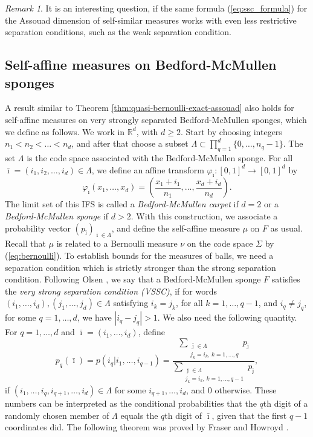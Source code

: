 \documentclass{PRM}
\newcommand{\field}[1]{\mathbb{#1}}
\newcommand{\R}{\field{R}}
\theoremstyle{plain}
\theoremstyle{definition}
\theoremstyle{remark}
\newtheorem{huom}[thm]{Remark}
\begin{document}
\begin{huom}
It is an interesting question, if the same formula (\ref{eq:ssc_formula}) for the Assouad dimension of self-similar measures works with even less restrictive separation conditions, such as the weak separation condition.
\end{huom}

\subsection{Self-affine measures on Bedford-McMullen sponges}

A result similar to Theorem \ref{thm:quasi-bernoulli-exact-assouad} also holds for self-affine measures on very strongly separated Bedford-McMullen sponges, which we define as follows. We work in $\R^d$, with $d\geq 2$. Start by choosing integers $n_1<n_2<\ldots<n_d$, and after that choose a subset $\Lambda\subset \prod_{q=1}^d\{0,\ldots,n_q - 1\}$. The set $\Lambda$ is the code space associated with the Bedford-McMullen sponge. For all $\bar{\imath}=(i_1,i_2,\ldots,i_d)\in\Lambda$, we define an affine transform $\varphi_{\bar{\imath}}:[0,1]^d\to[0,1]^d$ by
\begin{equation*}
    \varphi_{\bar{\imath}}(x_1,\ldots,x_d)=\left(\frac{x_1+i_1}{n_1},\ldots,\frac{x_d+i_d}{n_d}\right).
\end{equation*}
The limit set of this IFS is called a \emph{Bedford-McMullen carpet} if $d=2$ or a \emph{Bedford-McMullen sponge} if $d>2$. With this construction, we associate a probability vector $(p_{\bar{\imath}})_{\bar{\imath}\in\Lambda}$, and define the self-affine measure $\mu$ on $F$ as usual. Recall that $\mu$ is related to a Bernoulli measure $\nu$ on the code space $\Sigma$ by (\ref{eq:bernoulli}). To establish bounds for the measures of balls, we need a separation condition which is strictly stronger than the strong separation condition. Following Olsen \cite{O}, we say that a Bedford-McMullen sponge $F$ satisfies the \emph{very strong separation condition (VSSC)}, if for words $(i_1,\ldots,i_d),(j_1,\ldots,j_d)\in\Lambda$ satisfying $i_k=j_k$, for all $k=1,\ldots, q-1$, and $i_q\ne j_q$, for some $q=1,\ldots,d$, we have $|i_q-j_q|>1$.
We also need the following quantity. For $q=1,\ldots,d$ and $\bar{\imath}=(i_1,\ldots,i_d)$, define
\begin{equation}\label{eq:cond_prob}
    p_q(\bar{\imath})=p(i_q|i_1,\ldots,i_{q-1})=\dfrac{\sum\limits_{\substack{\bar{\jmath}\in \Lambda\\ j_k=i_k,\,k=1,\ldots,q}}p_{\bar{\jmath}}}{\sum\limits_{\substack{\bar{\jmath}\in \Lambda\\ j_k=i_k,\,k=1,\ldots,q-1}}p_{\bar{\jmath}}},
\end{equation}
if $(i_1,\ldots,i_q,i_{q+1},\ldots,i_d)\in\Lambda$ for some $i_{q+1},\ldots,i_d$, and 0 otherwise. These numbers can be interpreted as the conditional probabilities that the $q$th digit of a randomly chosen member of $\Lambda$ equals the $q$th digit of $\bar{\imath}$, given that the first $q-1$ coordinates did. The following theorem was proved by Fraser and Howroyd \cite[Theorem 2.6]{FH}.
\end{document}
